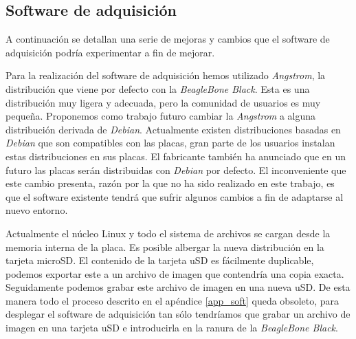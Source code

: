 	\subsection{Software de adquisición}
		A continuación se detallan una serie de mejoras y cambios que el software de adquisición podría experimentar a fin de mejorar.
		\begin{description}[style=unboxed,leftmargin=0cm,labelwidth=1cm]
		  	\item[debian]
			  	Para la realización del software de adquisición hemos utilizado \emph{Angstrom}, la distribución que viene por defecto con la
				\emph{BeagleBone Black}. Esta es una distribución muy ligera y adecuada, pero la comunidad de usuarios es muy pequeña.
				Proponemos como trabajo futuro cambiar la \emph{Angstrom} a alguna distribución derivada de \emph{Debian}. Actualmente existen
				distribuciones basadas en \emph{Debian} que son compatibles con las placas, gran parte de los usuarios instalan estas
				distribuciones en sus placas. El fabricante también ha anunciado que en un futuro las placas serán distribuidas con
				\emph{Debian} por defecto. El inconveniente que este cambio presenta, razón por la que no ha sido realizado en este trabajo,
				es que el software existente tendrá que sufrir algunos cambios a fin de adaptarse al nuevo entorno.
				\par
				Actualmente el núcleo Linux y todo el sistema de archivos se cargan desde la memoria interna de la placa. Es posible
				albergar la nueva distribución en la tarjeta microSD. El contenido de la tarjeta uSD es fácilmente duplicable, podemos
				exportar este a un archivo de imagen que contendría una copia exacta. Seguidamente podemos grabar este archivo de
				imagen en una nueva uSD. De esta manera todo el proceso descrito en el apéndice \ref{app_soft} queda obsoleto, para
				desplegar el software de adquisición tan sólo tendríamos que grabar un archivo de imagen en una tarjeta uSD e
				introducirla en la ranura de la \emph{BeagleBone Black}. 
		\end{description}
